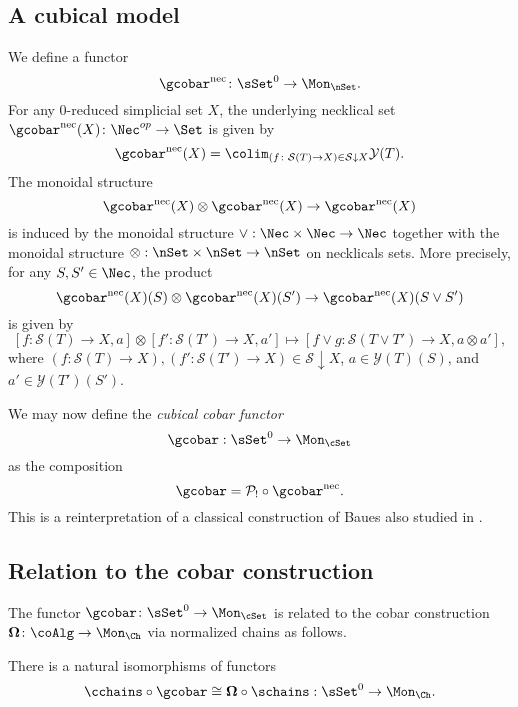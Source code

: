 \subsection{A cubical model}
We define a functor 
$$\gcobar^{\text{nec}} \colon \sSet^0 \to \Mon_{\nSet}.$$
For any $0$-reduced simplicial set $X$, the underlying necklical set $\gcobar^{\text{nec}}(X) \colon \Nec^{op} \to \Set$ is given by
$$\gcobar^{\text{nec}}(X) = \colim_{(f \colon \mathcal{S}(T) \to X) \in  \mathcal{S} \downarrow X} \mathcal{Y}(T).$$
The monoidal structure $$\gcobar^{\text{nec}}(X) \otimes \gcobar^{\text{nec}}(X) \to \gcobar^{\text{nec}}(X)$$
is induced by the monoidal structure $\vee: \Nec \times \Nec \to \Nec$ together with the monoidal structure $\otimes: \nSet \times \nSet \to \nSet$ on necklicals sets. More precisely, for any $S, S' \in \Nec$, the product $$\gcobar^{\text{nec}}(X)(S) \otimes \gcobar^{\text{nec}}(X)(S') \to \gcobar^{\text{nec}}(X)(S \vee S')$$ is given by $$[f\colon \mathcal{S}(T) \to X, a] \otimes [f'\colon \mathcal{S}(T') \to X, a'] \mapsto [f \vee g\colon \mathcal{S}(T\vee T') \to X, a \otimes  a'],$$
where $(f\colon \mathcal{S}(T) \to X), (f'\colon \mathcal{S}(T') \to X) \in \mathcal{S} \downarrow X$, $a\in \mathcal{Y}(T)(S)$, and $a'\in \mathcal{Y}(T')(S')$.

We may now define the \textit{cubical cobar functor} $$\gcobar: \sSet^0 \to \Mon_{\cSet}$$ as the composition $$\gcobar= \mathcal{P}_! \circ \gcobar^{\text{nec}}.$$ This is a reinterpretation of a classical construction of Baues \cite{baues1998hopf} also studied in \cite{rivera2018cubical}. 

\subsection{Relation to the cobar construction}

The functor $\gcobar\colon \sSet^0 \to \Mon_{\cSet}$ is related to the cobar construction $\mathbf{\Omega}\colon \coAlg \to \Mon_{\Ch}$ via normalized chains as follows.

\begin{proposition} \label{gcobarandcobar}
There is a natural isomorphisms of functors 
$$\cchains \circ \gcobar \cong \mathbf{\Omega} \circ \schains: \sSet^0 \to \Mon_{\Ch}.$$
\end{proposition}

